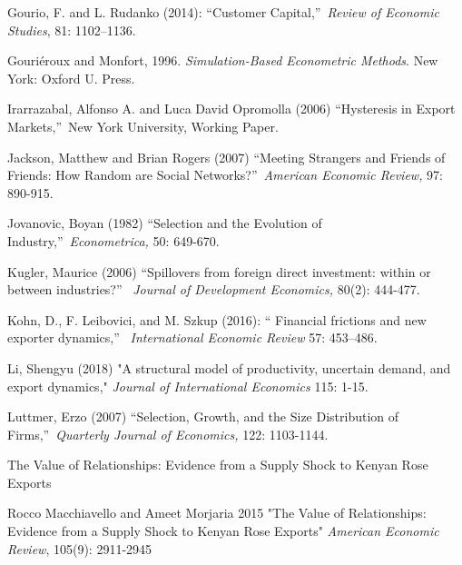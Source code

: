 \documentclass[12pt]{article}
\begin{document}
\begin{description}
\item Gourio, F. and L. Rudanko (2014): \textquotedblleft Customer
Capital,\textquotedblright\ \textit{Review of Economic Studies}, 81:
1102--1136.

\item Gouri\'{e}roux and Monfort, 1996. \textit{Simulation-Based Econometric
Methods}. New York: Oxford U. Press.

\item Irarrazabal, Alfonso A. and Luca David Opromolla (2006)
\textquotedblleft Hysteresis in Export Markets,\textquotedblright\ New York
University, Working Paper.

\item Jackson, Matthew and Brian Rogers (2007) \textquotedblleft Meeting
Strangers and Friends of Friends: How Random are Social
Networks?\textquotedblright\ \emph{American Economic Review,} 97: 890-915.

\item Jovanovic, Boyan (1982) \textquotedblleft Selection and the Evolution
of Industry,\textquotedblright\ \textit{Econometrica,} 50: 649-670.

\item Kugler, Maurice (2006) \textquotedblleft Spillovers from foreign
direct investment: within or between industries?\textquotedblright\ \textit{%
Journal of Development Economics, }80(2): 444-477.

\item Kohn, D., F. Leibovici, and M. Szkup (2016): \textquotedblleft
Financial frictions and new exporter dynamics,\textquotedblright\ \textit{%
International Economic Review} 57: 453--486.

\item Li, Shengyu (2018) "A structural model of productivity, uncertain
demand, and export dynamics," \textit{Journal of International Economics}
115: 1-15.

\item Luttmer, Erzo (2007) \textquotedblleft Selection, Growth, and the Size
Distribution of Firms,\textquotedblright\ \textit{Quarterly Journal of
Economics,} 122: 1103-1144.

\item The Value of Relationships: Evidence from a Supply Shock to Kenyan
Rose Exports

\item Rocco Macchiavello and Ameet Morjaria 2015 "The Value of
Relationships: Evidence from a Supply Shock to Kenyan Rose Exports" \textit{%
American Economic Review}, 105(9): 2911-2945


\end{description}
\end{document}
